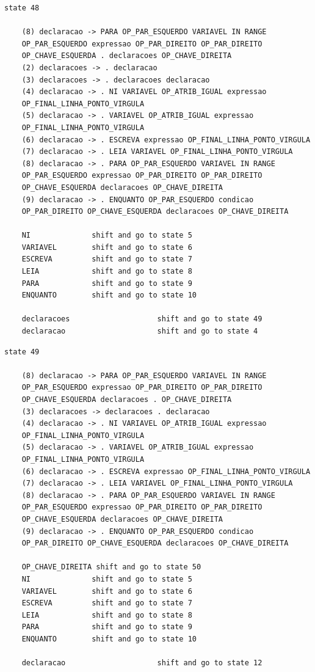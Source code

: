 \documentclass[a4paper,12pt]{article}
\begin{document}
\begin{verbatim}
state 48

    (8) declaracao -> PARA OP_PAR_ESQUERDO VARIAVEL IN RANGE 
    OP_PAR_ESQUERDO expressao OP_PAR_DIREITO OP_PAR_DIREITO 
    OP_CHAVE_ESQUERDA . declaracoes OP_CHAVE_DIREITA
    (2) declaracoes -> . declaracao
    (3) declaracoes -> . declaracoes declaracao
    (4) declaracao -> . NI VARIAVEL OP_ATRIB_IGUAL expressao 
    OP_FINAL_LINHA_PONTO_VIRGULA
    (5) declaracao -> . VARIAVEL OP_ATRIB_IGUAL expressao 
    OP_FINAL_LINHA_PONTO_VIRGULA
    (6) declaracao -> . ESCREVA expressao OP_FINAL_LINHA_PONTO_VIRGULA
    (7) declaracao -> . LEIA VARIAVEL OP_FINAL_LINHA_PONTO_VIRGULA
    (8) declaracao -> . PARA OP_PAR_ESQUERDO VARIAVEL IN RANGE 
    OP_PAR_ESQUERDO expressao OP_PAR_DIREITO OP_PAR_DIREITO 
    OP_CHAVE_ESQUERDA declaracoes OP_CHAVE_DIREITA
    (9) declaracao -> . ENQUANTO OP_PAR_ESQUERDO condicao 
    OP_PAR_DIREITO OP_CHAVE_ESQUERDA declaracoes OP_CHAVE_DIREITA

    NI              shift and go to state 5
    VARIAVEL        shift and go to state 6
    ESCREVA         shift and go to state 7
    LEIA            shift and go to state 8
    PARA            shift and go to state 9
    ENQUANTO        shift and go to state 10

    declaracoes                    shift and go to state 49
    declaracao                     shift and go to state 4
\end{verbatim}    
    
\begin{verbatim}
state 49

    (8) declaracao -> PARA OP_PAR_ESQUERDO VARIAVEL IN RANGE 
    OP_PAR_ESQUERDO expressao OP_PAR_DIREITO OP_PAR_DIREITO 
    OP_CHAVE_ESQUERDA declaracoes . OP_CHAVE_DIREITA
    (3) declaracoes -> declaracoes . declaracao
    (4) declaracao -> . NI VARIAVEL OP_ATRIB_IGUAL expressao 
    OP_FINAL_LINHA_PONTO_VIRGULA
    (5) declaracao -> . VARIAVEL OP_ATRIB_IGUAL expressao 
    OP_FINAL_LINHA_PONTO_VIRGULA
    (6) declaracao -> . ESCREVA expressao OP_FINAL_LINHA_PONTO_VIRGULA
    (7) declaracao -> . LEIA VARIAVEL OP_FINAL_LINHA_PONTO_VIRGULA
    (8) declaracao -> . PARA OP_PAR_ESQUERDO VARIAVEL IN RANGE 
    OP_PAR_ESQUERDO expressao OP_PAR_DIREITO OP_PAR_DIREITO 
    OP_CHAVE_ESQUERDA declaracoes OP_CHAVE_DIREITA
    (9) declaracao -> . ENQUANTO OP_PAR_ESQUERDO condicao 
    OP_PAR_DIREITO OP_CHAVE_ESQUERDA declaracoes OP_CHAVE_DIREITA

    OP_CHAVE_DIREITA shift and go to state 50
    NI              shift and go to state 5
    VARIAVEL        shift and go to state 6
    ESCREVA         shift and go to state 7
    LEIA            shift and go to state 8
    PARA            shift and go to state 9
    ENQUANTO        shift and go to state 10

    declaracao                     shift and go to state 12
\end{verbatim}    
    
\end{document}
